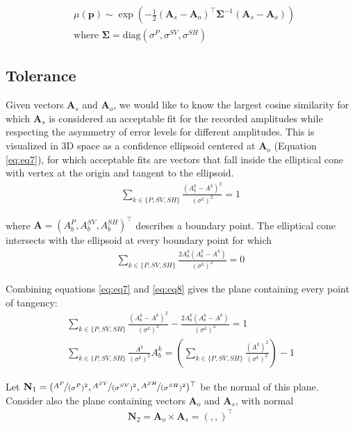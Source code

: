 \documentclass[preprint]{seismica}
\begin{document}
     \begin{align} \label{eq:eq6}
         &\mu(\mathbf{p}) \sim \exp \left( - \frac{1}{2} (\mathbf{A}_s - \mathbf{A}_o)^\top \mathbf{\Sigma}^{-1} (\mathbf{A}_s - \mathbf{A}_o) \right)\\
         \nonumber &\text{where } \mathbf{\Sigma} = \text{diag}(\sigma^P, \sigma^{SV}, \sigma^{SH})
     \end{align}

     \subsection{Tolerance}
     Given vectors $\mathbf{A}_s$ and $\mathbf{A}_o$, we would like to know the largest cosine
     similarity for which $\mathbf{A}_s$ is considered an acceptable fit for the recorded amplitudes
     while respecting the asymmetry of error levels for different amplitudes. This is visualized in 3D
     space as a confidence ellipsoid centered at $\mathbf{A}_o$ (Equation \ref{eq:eq7}), for which
     acceptable fits are vectors that fall inside the elliptical cone with vertex at the origin and
     tangent to the ellipsoid.
     \begin{align} \label{eq:eq7}
         \sum_{k \in \{P, SV, SH\}} \frac{(A^k_b-A^k)^2}{(\sigma^k)^2} = 1
     \end{align}
     
     where $\mathbf{A} = (A^P_b, A^{SV}_b, A^{SH}_b)^\top$ describes a boundary point. The elliptical
     cone intersects with the ellipsoid at every boundary point for which
     \begin{align} \label{eq:eq8}
         \sum_{k \in \{P, SV, SH\}} \frac{2A^k_b(A^k_b-A^k)}{(\sigma^k)^2} = 0
     \end{align}
     
     Combining equations \ref{eq:eq7} and \ref{eq:eq8} gives the plane containing every point of 
     tangency:
     \begin{align} \label{eq:eq9}
         \sum_{k \in \{P, SV, SH\}} \frac{(A^k_b-A^k)^2}{(\sigma^k)^2} - \frac{2A^k_b(A^k_b-A^k)}{(\sigma^k)^2} = 1\\
         \nonumber \sum_{k \in \{P, SV, SH\}} \frac{A^k}{(\sigma^k)^2} A^k_b = \left( \sum_{k \in \{P, SV, SH\}} \frac{(A^k)^2}{(\sigma^k)^2} \right) -1
     \end{align}

     Let $\mathbf{N}_1 = (\nicefrac{A^P}{(\sigma^P)^2}, \nicefrac{A^{SV}}{(\sigma^{SV})^2},
     \nicefrac{A^{SH}}{(\sigma^{SH})^2})^\top$ be the normal of this plane. Consider also the plane
     containing vectors $\mathbf{A}_o$ and $\mathbf{A}_s$, with normal
     \begin{align} \label{eq:eq10}
         \mathbf{N}_2 = \mathbf{A}_o \times \mathbf{A}_s = (,,)^\top
     \end{align}
\end{document}
